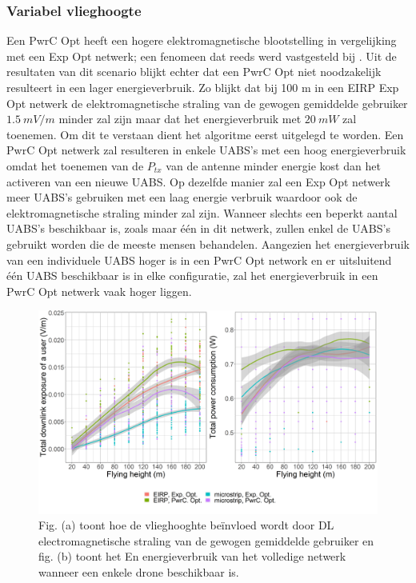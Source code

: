 \documentclass[twocolumn]{phdsymp_dutch}
\begin{document}
\subsubsection{Variabel vlieghoogte}
Een \gls{PwrC Opt} heeft een hogere elektromagnetische blootstelling in vergelijking met een
 \gls{Exp Opt} netwerk; een fenomeen dat reeds werd vastgesteld bij \cite{J1}. 
Uit de resultaten van dit scenario blijkt echter dat een
\gls{PwrC Opt} niet noodzakelijk resulteert in een lager energieverbruik.
Zo blijkt dat bij 100 m in een  \gls{EIRP} \gls{Exp Opt} netwerk
 de elektromagnetische straling van de gewogen gemiddelde gebruiker
 $1.5\ mV/m$ minder zal zijn maar dat het energieverbruik met $20\ mW$ zal toenemen.
Om dit te verstaan dient het algoritme eerst uitgelegd te worden.
Een  \gls{PwrC Opt} netwerk zal resulteren in enkele \gls{UABS}'s met een hoog energieverbruik 
omdat het toenemen van de $P_{tx}$ van de antenne minder energie kost dan het activeren van een nieuwe \gls{UABS}.
Op dezelfde manier zal een \gls{Exp Opt} netwerk meer \gls{UABS}'s gebruiken met een laag energie verbruik waardoor ook de elektromagnetische straling minder zal zijn.
Wanneer slechts een beperkt aantal \gls{UABS}'s beschikbaar is, zoals maar \'e\'en in dit netwerk, 
zullen enkel de \gls{UABS}'s gebruikt worden die de meeste mensen behandelen.
Aangezien het energieverbruik van een individuele \gls{UABS} hoger is in een \gls{PwrC Opt} network en er uitsluitend 
\'e\'en \gls{UABS} beschikbaar is in elke configuratie, zal 
 het energieverbruik in een \gls{PwrC Opt} netwerk vaak hoger liggen.

\begin{figure}[h!]
  \includegraphics[width=\linewidth]{s2/fhvsdlAndPc.png}
  \caption{Fig. (a) toont hoe de vlieghooghte be\"invloed wordt door \acs{DL} electromagnetische straling van de 
  gewogen gemiddelde gebruiker en fig. (b) toont het En energieverbruik van het volledige netwerk wanneer een enkele drone beschikbaar is.}
  \label{fig:s2a_dlAndPc}
\end{figure}
\end{document}
